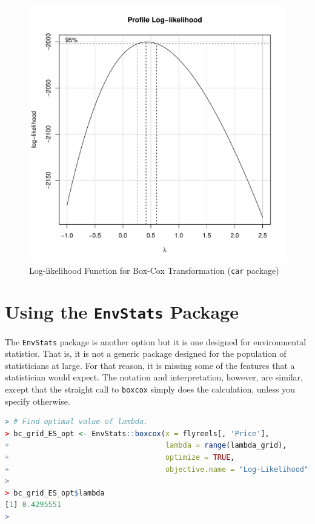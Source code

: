 \begin{figure}[h!]
  \centering
  \includegraphics[scale = 0.5, keepaspectratio=true]{../Figures/plot_like_car}
  \caption{Log-likelihood Function for Box-Cox Transformation (\texttt{car} package)} \label{fig:plot_like_car}
\end{figure}


\clearpage
\section{Using the \texttt{EnvStats} Package}


The \texttt{EnvStats} package is another option
but it is one designed for environmental statistics.
That is, it is not a generic package designed for the population of statisticians at large.
For that reason, it is missing some of the features that
a statistician would expect.
The notation and interpretation, however, are similar, 
except that the straight call to \texttt{boxcox}
simply does the calculation, 
unless you specify otherwise.

\begin{lstlisting}[language=R]
> # Find optimal value of lambda.
> bc_grid_ES_opt <- EnvStats::boxcox(x = flyreels[, 'Price'],
+                                    lambda = range(lambda_grid),
+                                    optimize = TRUE,
+                                    objective.name = "Log-Likelihood")
> 
> bc_grid_ES_opt$lambda
[1] 0.4295551
> 
\end{lstlisting}


